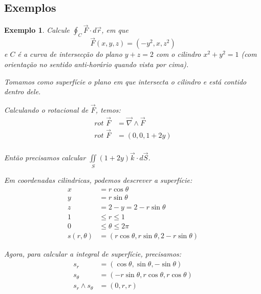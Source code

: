 \documentclass{article}
\newcommand{\doubleint}[2] {\iint\limits_{#1} #2}
\newcommand{\Rot}[0] {\textit{rot }}
\newtheorem{example}{Exemplo}[section]
\begin{document}
        \subsection{Exemplos}
            \begin{example}
                Calcule $\oint_C \vec{F} \cdot d\vec{r}$, em que
                \[
                    \vec{F}(x,y,z) = (-y^2, x, z^2)
                \]
                e $C$ é a curva de intersecção do plano $y + z = 2$ com o cilindro $x^2 + y^2 = 1$
                (com orientação no sentido anti-horário quando vista por cima).

                Tomamos como superfície o plano em que intersecta o cilindro e está contido dentro dele.

                Calculando o rotacional de $\vec{F}$, temos:
                \begin{align*}
                    \Rot \vec{F} &= \vec{\nabla} \wedge \vec{F}\\
                    \Rot \vec{F} &= (0, 0, 1 + 2y)\\ 
                \end{align*}

                Então precisamos calcular $\doubleint{S}{(1 + 2y)\vec{k} \cdot d\vec{S}}$.

                Em coordenadas cilindricas, podemos descrever a superfície:
                \begin{align*}
                    x &= r\cos\theta\\
                    y &= r\sin\theta\\
                    z &= 2 - y = 2 - r\sin\theta\\
                    1 &\leq r \leq 1\\
                    0 &\leq \theta \leq 2\pi\\
                    s(r, \theta) &= (r\cos\theta, r\sin\theta, 2 - r\sin\theta)
                \end{align*}

                Agora, para calcular a integral de superfície, precisamos:
                \begin{align*}
                    s_r &= (\cos\theta, \sin\theta, -\sin\theta)\\
                    s_\theta &= (-r\sin\theta, r\cos\theta, r\cos\theta)\\
                    s_r \wedge s_\theta &= (0, r, r)\\
                \end{align*}


\end{example}
\end{document}
